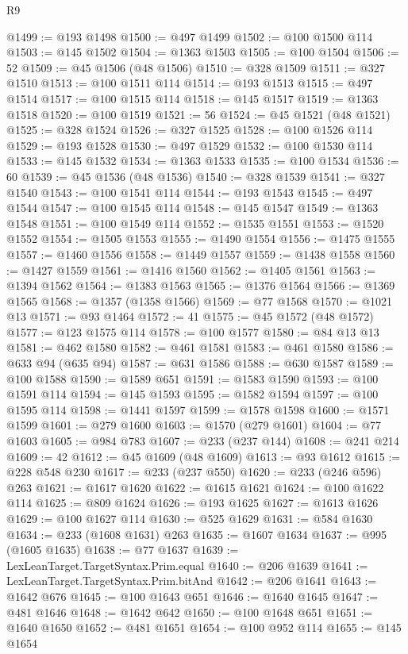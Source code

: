 \begin{lexlean}{R9}
\begin{coremodule}
@1499 := @193 @1498
@1500 := @497 @1499
@1502 := @100 @1500 @114
@1503 := @145 @1502
@1504 := @1363 @1503
@1505 := @100 @1504
@1506 := 52
@1509 := @45 @1506 (@48 @1506)
@1510 := @328 @1509
@1511 := @327 @1510
@1513 := @100 @1511 @114
@1514 := @193 @1513
@1515 := @497 @1514
@1517 := @100 @1515 @114
@1518 := @145 @1517
@1519 := @1363 @1518
@1520 := @100 @1519
@1521 := 56
@1524 := @45 @1521 (@48 @1521)
@1525 := @328 @1524
@1526 := @327 @1525
@1528 := @100 @1526 @114
@1529 := @193 @1528
@1530 := @497 @1529
@1532 := @100 @1530 @114
@1533 := @145 @1532
@1534 := @1363 @1533
@1535 := @100 @1534
@1536 := 60
@1539 := @45 @1536 (@48 @1536)
@1540 := @328 @1539
@1541 := @327 @1540
@1543 := @100 @1541 @114
@1544 := @193 @1543
@1545 := @497 @1544
@1547 := @100 @1545 @114
@1548 := @145 @1547
@1549 := @1363 @1548
@1551 := @100 @1549 @114
@1552 := @1535 @1551
@1553 := @1520 @1552
@1554 := @1505 @1553
@1555 := @1490 @1554
@1556 := @1475 @1555
@1557 := @1460 @1556
@1558 := @1449 @1557
@1559 := @1438 @1558
@1560 := @1427 @1559
@1561 := @1416 @1560
@1562 := @1405 @1561
@1563 := @1394 @1562
@1564 := @1383 @1563
@1565 := @1376 @1564
@1566 := @1369 @1565
@1568 := @1357 (@1358 @1566)
@1569 := @77 @1568
@1570 := @1021 @13
@1571 := @93 @1464
@1572 := 41
@1575 := @45 @1572 (@48 @1572)
@1577 := @123 @1575 @114
@1578 := @100 @1577
@1580 := @84 @13 @13
@1581 := @462 @1580
@1582 := @461 @1581
@1583 := @461 @1580
@1586 := @633 @94 (@635 @94)
@1587 := @631 @1586
@1588 := @630 @1587
@1589 := @100 @1588
@1590 := @1589 @651
@1591 := @1583 @1590
@1593 := @100 @1591 @114
@1594 := @145 @1593
@1595 := @1582 @1594
@1597 := @100 @1595 @114
@1598 := @1441 @1597
@1599 := @1578 @1598
@1600 := @1571 @1599
@1601 := @279 @1600
@1603 := @1570 (@279 @1601)
@1604 := @77 @1603
@1605 := @984 @783
@1607 := @233 (@237 @144)
@1608 := @241 @214
@1609 := 42
@1612 := @45 @1609 (@48 @1609)
@1613 := @93 @1612
@1615 := @228 @548 @230
@1617 := @233 (@237 @550)
@1620 := @233 (@246 @596) @263
@1621 := @1617 @1620
@1622 := @1615 @1621
@1624 := @100 @1622 @114
@1625 := @809 @1624
@1626 := @193 @1625
@1627 := @1613 @1626
@1629 := @100 @1627 @114
@1630 := @525 @1629
@1631 := @584 @1630
@1634 := @233 (@1608 @1631) @263
@1635 := @1607 @1634
@1637 := @995 (@1605 @1635)
@1638 := @77 @1637
@1639 := LexLeanTarget.TargetSyntax.Prim.equal
@1640 := @206 @1639
@1641 := LexLeanTarget.TargetSyntax.Prim.bitAnd
@1642 := @206 @1641
@1643 := @1642 @676
@1645 := @100 @1643 @651
@1646 := @1640 @1645
@1647 := @481 @1646
@1648 := @1642 @642
@1650 := @100 @1648 @651
@1651 := @1640 @1650
@1652 := @481 @1651
@1654 := @100 @952 @114
@1655 := @145 @1654

\end{coremodule}
\end{lexlean}
